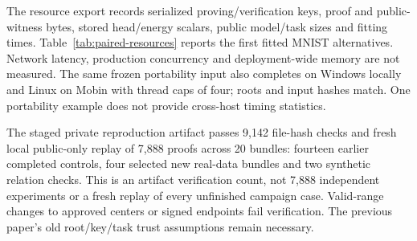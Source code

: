 The resource export records serialized proving/verification keys, proof and
public-witness bytes, stored head/energy scalars, public model/task sizes and
fitting times. Table~\ref{tab:paired-resources} reports the first fitted MNIST
alternatives. Network latency, production concurrency and deployment-wide
memory are not measured. The same frozen portability input also completes on
Windows locally and Linux on Mobin with thread caps of four; roots and input
hashes match. One portability example does not provide cross-host timing
statistics.

The staged private reproduction artifact passes 9,142 file-hash checks and
fresh local public-only replay of 7,888 proofs across 20 bundles: fourteen
earlier completed controls, four selected new real-data bundles and two
synthetic relation checks. This is an artifact verification count, not 7,888
independent experiments or a fresh replay of every unfinished campaign case.
Valid-range changes to approved centers or signed endpoints fail verification.
The previous paper's old root/key/task trust assumptions remain necessary.
